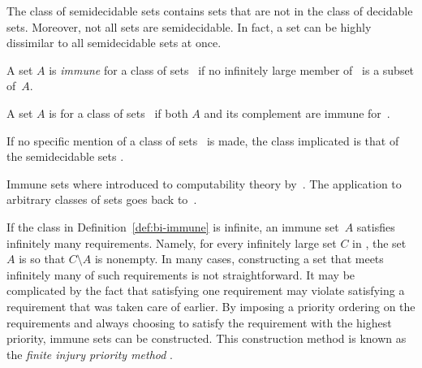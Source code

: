 The class of semidecidable sets contains sets that are not in the class of decidable sets.
Moreover, not all sets are semidecidable.
In fact, a set can be highly dissimilar to all semidecidable sets at once.
\begin{definition}
\label{def:bi-immune}%
  A set $A$ is \emph{immune} for a class of sets~ if no infinitely large member of~ is a subset of~$A$.

  A set $A$ is  for a class of sets~ if both $A$ and its complement are immune for~.

  If no specific mention of a class of sets~ is made, the class implicated is that of the semidecidable sets \parencite{rogers1967theory,odifreddi1992classical}.
\end{definition}
Immune sets where introduced to computability theory by~\textcite{post1944recursively}.
The application to arbitrary classes of sets goes back to~\textcite{flajolet1974sets}.

If the class  in Definition~\ref{def:bi-immune} is infinite, an immune set~$A$ satisfies infinitely many requirements.
Namely, for every infinitely large set $C$ in , the set~$A$ is so that $C \setminus A$ is nonempty.
In many cases, constructing a set that meets infinitely many of such requirements is not straightforward.
It may be complicated by the fact that satisfying one requirement may violate satisfying a requirement that was taken care of earlier.
By imposing a priority ordering on the requirements and always choosing to satisfy the requirement with the highest priority, immune sets can be constructed.
This construction method is known as the \emph{finite injury priority method} \parencite[for details, see][Section~2.11]{downey2010algorithmic}.

